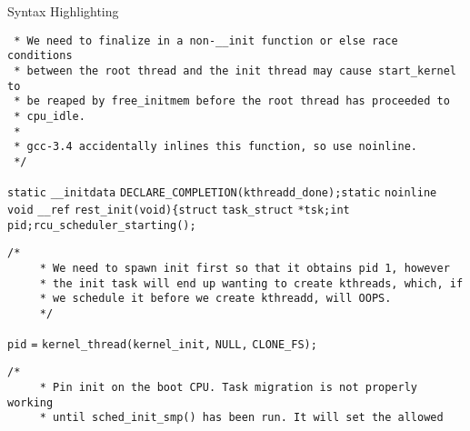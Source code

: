 \begin{frame}{Syntax Highlighting}
\begin{verbatim}
 * We need to finalize in a non-__init function or else race conditions
 * between the root thread and the init thread may cause start_kernel to
 * be reaped by free_initmem before the root thread has proceeded to
 * cpu_idle.
 *
 * gcc-3.4 accidentally inlines this function, so use noinline.
 */\end{verbatim}\leavevmode\newline\newline\color{BurntOrange}\verb$static$ \color{Aquamarine}\verb$__initdata$ \color{Aquamarine}\verb$DECLARE_COMPLETION$\color{Fuchsia}\verb$($\color{Aquamarine}\verb$kthreadd_done$\color{Fuchsia}\verb$)$\color{Fuchsia}\verb$;$\newline\newline\color{BurntOrange}\verb$static$ \color{Aquamarine}\verb$noinline$ \color{BurntOrange}\verb$void$ \color{Aquamarine}\verb$__ref$ \color{Aquamarine}\verb$rest_init$\color{Fuchsia}\verb$($\color{BurntOrange}\verb$void$\color{Fuchsia}\verb$)$\newline\color{Fuchsia}\verb${$\newline\tab\color{BurntOrange}\verb$struct$ \color{Aquamarine}\verb$task_struct$ \color{Goldenrod}\verb$*$\color{Aquamarine}\verb$tsk$\color{Fuchsia}\verb$;$\newline\tab\color{BurntOrange}\verb$int$ \color{Aquamarine}\verb$pid$\color{Fuchsia}\verb$;$\newline\newline\tab\color{Aquamarine}\verb$rcu_scheduler_starting$\color{Fuchsia}\verb$($\color{Fuchsia}\verb$)$\color{Fuchsia}\verb$;$\newline\tab\color{Rhodamine}\begin{verbatim}/*
	 * We need to spawn init first so that it obtains pid 1, however
	 * the init task will end up wanting to create kthreads, which, if
	 * we schedule it before we create kthreadd, will OOPS.
	 */\end{verbatim}\leavevmode\newline\tab\color{Aquamarine}\verb$pid$ \color{Fuchsia}\verb$=$ \color{Aquamarine}\verb$kernel_thread$\color{Fuchsia}\verb$($\color{Aquamarine}\verb$kernel_init$\color{Fuchsia}\verb$,$ \color{Aquamarine}\verb$NULL$\color{Fuchsia}\verb$,$ \color{Aquamarine}\verb$CLONE_FS$\color{Fuchsia}\verb$)$\color{Fuchsia}\verb$;$\newline\tab\color{Rhodamine}\begin{verbatim}/*
	 * Pin init on the boot CPU. Task migration is not properly working
	 * until sched_init_smp() has been run. It will set the allowed

\end{verbatim}
\end{frame}
